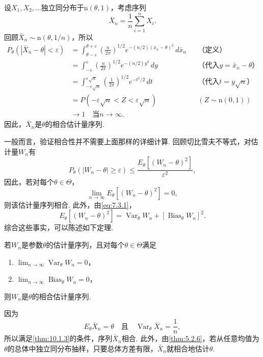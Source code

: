 \begin{example}\label{ex:10.1.2}
设$X_1,X_2,\ldots$独立同分布于$\mathrm n(\theta,1)$，考虑序列
$$\bar X_n=\frac1n\sum_{i=1}^nX_i.$$
回顾$\bar X_n\sim\mathrm n(\theta,1/n)$，所以
\begin{align*}
P_\theta(|\bar X_n-\theta|<\varepsilon)
&=\int_{\theta-\varepsilon}^{\theta+\varepsilon}\left(\frac n{2\pi}\right)^{1/2}e^{-(n/2)(\bar x_n-\theta)^2}\,d\bar x_n &&\text{（定义）}\\
&=\int_{-\varepsilon}^{\varepsilon}\left(\frac n{2\pi}\right)^{1/2}e^{-(n/2)y^2}\,dy &&\text{（代入$y=\bar x_n-\theta$）}\\
&=\int_{-\varepsilon\sqrt n}^{\varepsilon\sqrt n}\left(\frac1{2\pi}\right)^{1/2}e^{-t^2/2}\,dt &&\text{（代入$t=y\sqrt n$）}\\
&=P(-\varepsilon\sqrt n<Z<\varepsilon\sqrt n) &&(Z\sim\mathrm n(0,1))\\
&\longrightarrow1\quad\text{当$n\to\infty$}.
\end{align*}
因此，$\bar X_n$是$\theta$的相合估计量序列.
\end{example}

一般而言，验证相合性并不需要上面那样的详细计算. 回顾切比雪夫不等式，对估计量$W_n$有
$$P_\theta(|W_n-\theta|\geq\varepsilon)\leq\frac{E_\theta[(W_n-\theta)^2]}{\varepsilon^2},$$
因此，若对每个$\theta\in\Theta$，
$$\lim_{n\to\infty}E_\theta[(W_n-\theta)^2]=0,$$
则该估计量序列相合. 此外，由\eqref{eq:7.3.1}，
\begin{equation}\label{eq:10.1.3}
E_\theta[(W_n-\theta)^2]=\operatorname{Var}_\theta W_n+[\operatorname{Bias}_\theta W_n]^2.
\end{equation}
综合这些事实，可以陈述如下定理.

\begin{theorem}\label{thm:10.1.3}
若$W_n$是参数$\theta$的估计量序列，且对每个$\theta\in\Theta$满足
\begin{enumerate}[label=\roman*.]
\item $\lim_{n\to\infty}\operatorname{Var}_\theta W_n=0$，
\item $\lim_{n\to\infty}\operatorname{Bias}_\theta W_n=0$，
\end{enumerate}
则$W_n$是$\theta$的相合估计量序列.
\end{theorem}

\begin{example}[续\autoref{ex:10.1.2}]\label{ex:10.1.4}
因为
$$E_\theta\bar X_n=\theta\quad\text{且}\quad\operatorname{Var}_\theta\bar X_n=\frac1n,$$
所以满足\autoref{thm:10.1.3}的条件，序列$\bar X_n$相合. 此外，由\autoref{thm:5.2.6}，若从任意均值为$\theta$的总体中独立同分布抽样，只要总体方差有限，$\bar X_n$就相合地估计$\theta$.
\end{example}

